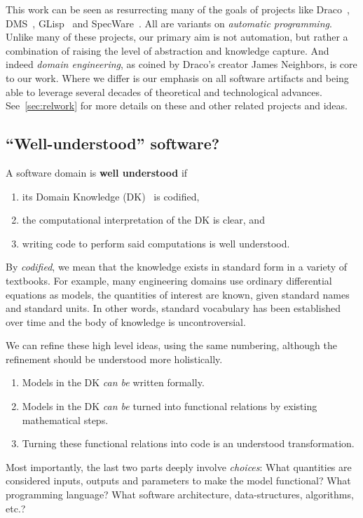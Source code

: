 \documentclass[a4paper,UKenglish,cleveref,autoref,thm-restate]{oasics-v2021}
\begin{document}
This work can be seen as resurrecting many of the goals of projects like
Draco~\cite{neighbors1984draco,neighbors1989draco}, 
DMS~\cite{baxter1992design,baxter2002dms}, 
GLisp~\cite{novak1983glisp,novak1994generating} and 
SpecWare~\cite{srinivas95specware,smith1999mechanizing}. 
All are
variants on \emph{automatic programming}. Unlike many of these projects, our
primary aim is not automation, but rather a combination of raising the level
of abstraction and knowledge capture. And indeed \emph{domain engineering},
as coined by Draco's creator James Neighbors, is core to our work. Where we
differ is our emphasis on all software artifacts and being able to leverage
several decades of theoretical and technological advances. See~\ref{sec:relwork}
for more details on these and other related projects and ideas.

\subsection{``Well-understood'' software?}
\label{subsec:well-understood}

\begin{definition}
\label{defn:well-understood}
A software domain is \textbf{well understood} if
\begin{enumerate}
    \item its Domain Knowledge (DK)~\cite{bjorner2021domaineng} is codified,
    \item the computational interpretation of the DK is clear, and
    \item writing code to perform said computations is well understood.
\end{enumerate}
\end{definition}

By \emph{codified}, we mean that the knowledge exists in standard form in a
variety of textbooks. For example, many engineering domains use ordinary
differential equations as models, the quantities of interest are known, given
standard names and standard units. In other words, standard vocabulary has been
established over time and the body of knowledge is uncontroversial.

We can refine these high level ideas, using the same numbering, although the
refinement should be understood more holistically.
\begin{enumerate}
\item Models in the DK \emph{can be} written formally.
\item Models in the DK \emph{can be} turned into functional relations by
 existing mathematical steps.
\item Turning these functional relations into code is an understood
 transformation.
\end{enumerate}
Most importantly, the last two parts deeply involve \emph{choices}: What
quantities are considered inputs, outputs and parameters to make the model
functional? What programming language?  What software architecture,
data-structures, algorithms, etc.?
\end{document}
